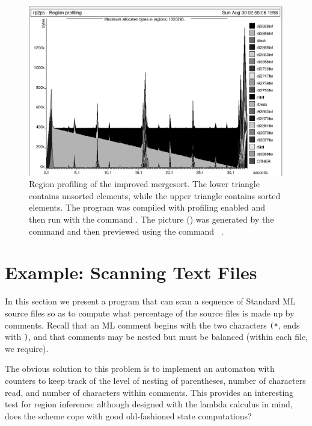 \documentclass[12pt]{book}
\begin{document}
\begin{figure}
\begin{center}
\includegraphics{msortreset2.ps}
\end{center}
\caption{Region profiling of the improved mergesort. 
The lower triangle contains unsorted elements, while the
upper triangle contains sorted elements.
The program was compiled with
profiling enabled and then run with the command
. The picture () 
was generated by the 
%
%
command 
and then previewed using the command ~.}
\label{msortreset.fig}
\end{figure}

\section{Example: Scanning Text Files}
\label{scan.sec}
In this section we present a program that can 
scan a sequence of Standard ML source
files so as to compute what percentage of the source files is made
up by comments. Recall that an ML comment begins with the two
characters {\tt (*}, ends with {\tt *)}, and that comments may be
nested but must be balanced (within each file, we require).

The obvious solution to this problem is to implement an
automaton with counters to keep track of the level
of nesting of parentheses, number of characters read, and
number of characters within comments. This provides an interesting test
for region inference: although designed with the lambda calculus
in mind, does the scheme cope with good old-fashioned state
computations? 
\end{document}
